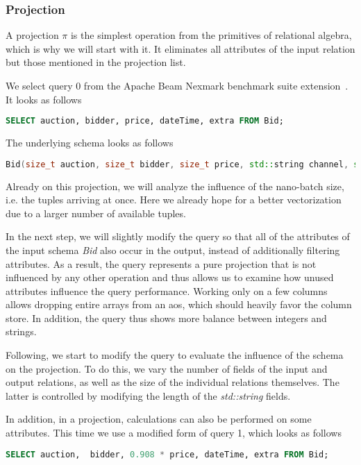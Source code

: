 \subsubsection{Projection}

A projection $\pi$ is the simplest operation from the primitives of relational algebra, which is why we will start with it.
It eliminates all attributes of the input relation but those mentioned in the projection list.

We select query 0 from the Apache Beam Nexmark benchmark suite extension~\cite[]{apachebeam}.
It looks as follows
\begin{lstlisting}[language=SQL]
SELECT auction, bidder, price, dateTime, extra FROM Bid;
\end{lstlisting}
The underlying schema looks as follows
\begin{lstlisting}[language=c++]
Bid(size_t auction, size_t bidder, size_t price, std::string channel, std::string url, time_t dateTime, std::string extra);
\end{lstlisting}
Already on this projection, we will analyze the influence of the nano-batch size, i.e. the tuples arriving at once.
Here we already hope for a better vectorization due to a larger number of available tuples.

In the next step, we will slightly modify the query so that all of the attributes of the input schema \emph{Bid} also occur in the output, instead of additionally filtering attributes.
As a result, the query represents a pure projection that is not influenced by any other operation and thus allows us to examine how unused attributes influence the query performance.
Working only on a few columns allows dropping entire arrays from an \ac{aos}, which should heavily favor the column store.
In addition, the query thus shows more balance between integers and strings.

Following, we start to modify the query to evaluate the influence of the schema on the projection.
To do this, we vary the number of fields of the input and output relations, as well as the size of the individual relations themselves.
The latter is controlled by modifying the length of the \emph{std::string} fields.

In addition, in a projection, calculations can also be performed on some attributes.
This time we use a modified form of query 1, which looks as follows
\begin{lstlisting}[language=SQL]
SELECT auction,  bidder, 0.908 * price, dateTime, extra FROM Bid;
\end{lstlisting}

